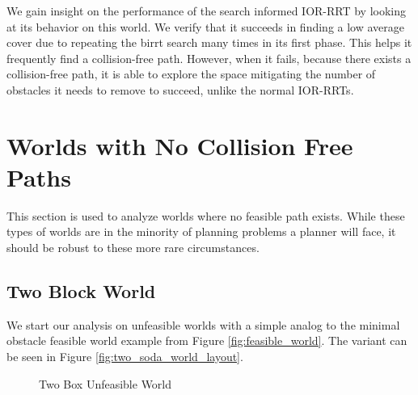 We gain insight on the performance of the search informed IOR-RRT by looking at its behavior on this world. We verify that it succeeds in finding a low average cover due to repeating the birrt search many times in its first phase. This helps it frequently find a collision-free path. However, when it fails, because there exists a collision-free path, it is able to explore the space mitigating the number of obstacles it needs to remove to succeed, unlike the normal IOR-RRTs.

\section{Worlds with No Collision Free Paths}\label{results:unfeasible}
This section is used to analyze worlds where no feasible path exists. While these types of worlds are in the minority of planning problems a planner will face, it should be robust to these more rare circumstances. 

\subsection{Two Block World}
We start our analysis on unfeasible worlds with a simple analog to the minimal obstacle feasible world example from Figure \ref{fig:feasible_world}. The variant can be seen in Figure \ref{fig:two_soda_world_layout}.

\begin{figure}[!h]
    \hfill
    \caption{Two Box Unfeasible World}
    \label{fig:two_soda_world}
\end{figure}


